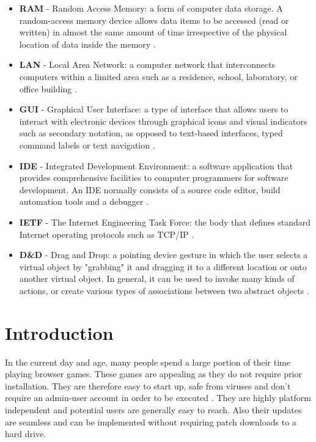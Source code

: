 \documentclass[bsc, 12pt, twoside, singlespacing, parskip, abbrevs, notimes, normalheadings, logo]{styles/infthesis}
\begin{document}
\begin{itemize}
\item \textbf{RAM} - Random Access Memory: a form of computer data storage. A random-access memory device allows data items to be accessed (read or written) in almost the same amount of time irrespective of the physical location of data inside the memory \cite{def_RAM}.\\
\item \textbf{LAN} - Local Area Network: a computer network that interconnects computers within a limited area such as a residence, school, laboratory, or office building \cite{def_LAN}.
\item \textbf{GUI} - Graphical User Interface: a type of interface that allows users to interact with electronic devices through graphical icons and visual indicators such as secondary notation, as opposed to text-based interfaces, typed command labels or text navigation \cite{def_GUI}. 
\item \textbf{IDE} - Integrated Development Environment: a software application that provides comprehensive facilities to computer programmers for software development. An IDE normally consists of a source code editor, build automation tools and a debugger \cite{def_IDE}.
\item \textbf{IETF} - The Internet Engineering Task Force: the body that defines standard Internet operating protocols such as TCP/IP \cite{def_IETF}. 
\item \textbf{D\&D} - Drag and Drop: a pointing device gesture in which the user selects a virtual object by "grabbing" it and dragging it to a different location or onto another virtual object. In general, it can be used to invoke many kinds of actions, or create various types of associations between two abstract objects \cite{def_DND}.
\end{itemize}

\tableofcontents




\chapter{Introduction}
\setcounter{page}{1}
\vspace{-2em}
In the current day and age, many people spend a large portion of their time playing browser games. These games are appealing as they do not require prior installation. They are therefore easy to start up, safe from viruses and don't require an admin-user account in order to be executed \cite{Web_Apps_Superior}. They are highly platform independent and potential users are generally easy to reach. Also their updates are seamless and can be implemented without requiring patch downloads to a hard drive.
\end{document}
